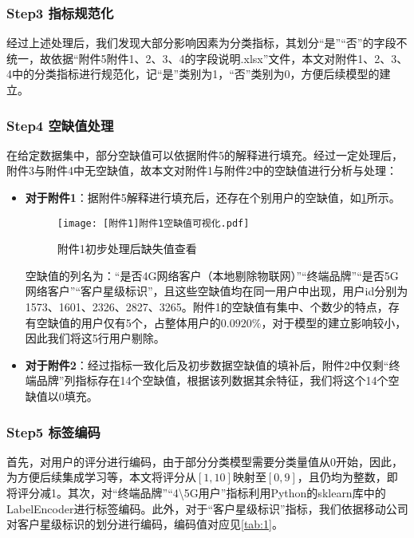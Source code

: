 \documentclass{MathorCupmodeling}
\begin{document}
	\subsubsection*{Step3 指标规范化}
	经过上述处理后，我们发现大部分影响因素为分类指标，其划分“是”“否”的字段不统一，故依据“附件5附件1、2、3、4的字段说明.xlsx”文件，本文对附件1、2、3、4中的分类指标进行规范化，记“是”类别为1，“否”类别为0，方便后续模型的建立。
	\subsubsection*{Step4 空缺值处理}
	在给定数据集中，部分空缺值可以依据附件5的解释进行填充。经过一定处理后，附件3与附件4中无空缺值，故本文对附件1与附件2中的空缺值进行分析与处理：
	\begin{itemize}
		\item \textbf{对于附件1}：据附件5解释进行填充后，还存在个别用户的空缺值，如\textcolor{blue}{\cref{fig:NaNView}}所示。
		\begin{figure}[h!t]
			\centerline{\texttt{[image: [附件1]附件1空缺值可视化.pdf]}}
			\caption{附件1初步处理后缺失值查看}\label{fig:NaNView}
		\end{figure}
		空缺值的列名为：“是否4G网络客户（本地剔除物联网）”“终端品牌”“是否5G网络客户”“客户星级标识”，且这些空缺值均在同一用户中出现，用户id分别为1573、1601、2326、2827、3265。附件1的空缺值有集中、个数少的特点，存有空缺值的用户仅有5个，占整体用户的$0.0920\%$，对于模型的建立影响较小，因此我们将这5行用户剔除。
		\item \textbf{对于附件2}：经过指标一致化后及初步数据空缺值的填补后，附件2中仅剩“终端品牌”列指标存在14个空缺值，根据该列数据其余特征，我们将这个14个空缺值以0填充。
	\end{itemize}
	\subsubsection*{Step5 标签编码}
	首先，对用户的评分进行编码，由于部分分类模型需要分类量值从0开始，因此，为方便后续集成学习等，本文将评分从$\left[1,10\right]$映射至$\left[0,9\right]$，且仍均为整数，即将评分减1。其次，对“终端品牌”“4\textbackslash{}5G用户”指标利用Python的sklearn库中的LabelEncoder进行标签编码。此外，对于“客户星级标识”指标，我们依据移动公司对客户星级标识的划分进行编码，编码值对应见\textcolor{blue}{\cref{tab:1}}。
	\begin{table}[htbp]
		\centering
		\caption{客户星级标识编码对应表}\label{tab:1}
	\end{table}
\end{document}
